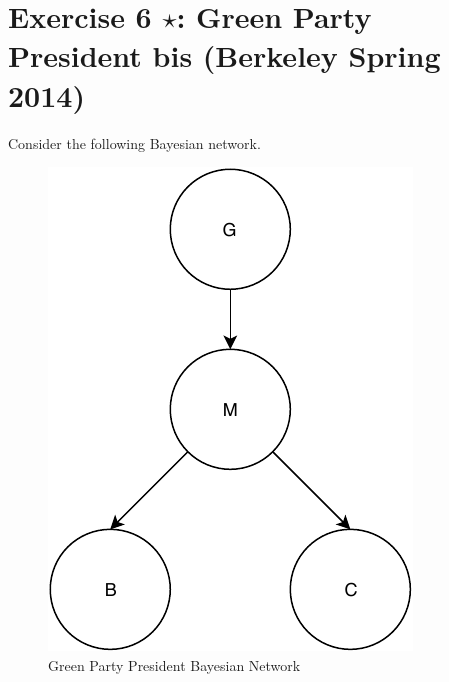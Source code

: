 \documentclass[9pt,a4paper]{extarticle}
\begin{document}
\section*{Exercise 6 $\star$: Green Party President bis (Berkeley Spring 2014) }
Consider the following Bayesian network.
\begin{figure}[H]
    \centering
    \includegraphics{figures/GPP_bnet.pdf}
    \caption{Green Party President Bayesian Network}
    \label{fig:gpp_net}
\end{figure}
\end{document}
